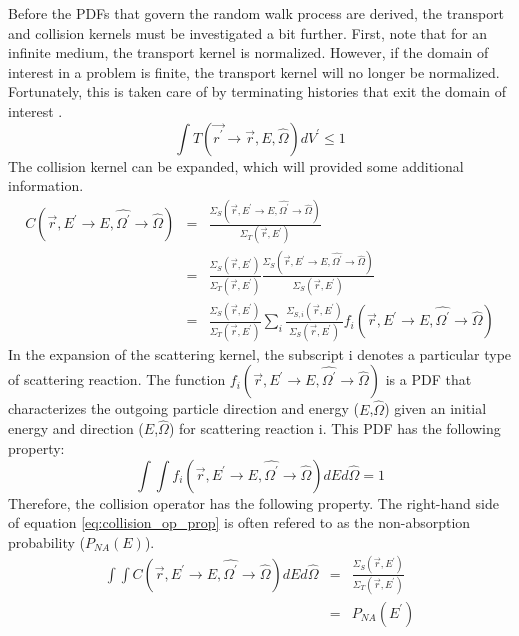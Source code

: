 Before the PDFs that govern the random walk process are derived, the transport
and collision kernels must be investigated a bit further. First, note that
for an infinite medium, the transport kernel is normalized. However, if the
domain of interest in a problem is finite, the transport kernel will no longer
be normalized. Fortunately, this is taken care of by terminating histories 
that exit the domain of interest \citep{irving_adjoint_1971}.
\begin{equation}
  \int T(\vec{r^{'}} \to \vec{r},E,\hat{\Omega})dV^{'} \leq 1
\end{equation}
The collision kernel can be expanded, which will provided some additional 
information. 
\begin{eqnarray}
  C(\vec{r},E^{'} \to E,\hat{\Omega^{'}} \to \hat{\Omega}) & = & 
  \frac{\Sigma_S(\vec{r},E^{'} \to E,\hat{\Omega^{'}} \to \hat{\Omega})}
       {\Sigma_T(\vec{r},E^{'})} \nonumber \\
  & = & \frac{\Sigma_S(\vec{r},E^{'})}{\Sigma_T(\vec{r},E^{'})}
       \frac{\Sigma_S(\vec{r},E^{'} \to E,\hat{\Omega^{'}} \to \hat{\Omega})}
            {\Sigma_S(\vec{r},E^{'})} \nonumber \\
  & = & \frac{\Sigma_S(\vec{r},E^{'})}{\Sigma_T(\vec{r},E^{'})} \sum_i
        \frac{\Sigma_{S,i}(\vec{r},E^{'})}{\Sigma_S(\vec{r},E^{'})}
        f_i(\vec{r},E^{'} \to E,\hat{\Omega^{'}} \to \hat{\Omega}) \nonumber
\end{eqnarray}
In the expansion of the scattering kernel, the subscript i denotes a particular
type of scattering reaction. The function 
$f_i(\vec{r},E^{'} \to E,\hat{\Omega^{'}} \to \hat{\Omega})$ is a PDF that 
characterizes the outgoing particle direction and energy ($E$,$\hat{\Omega}$) 
given an initial energy and direction ($E$,$\hat{\Omega}$) for scattering 
reaction i. This PDF has the following property:
\begin{equation}
  \int\int f_i(\vec{r},E^{'} \to E,\hat{\Omega^{'}} \to \hat{\Omega}) 
  dEd\hat{\Omega} = 1
\end{equation}
Therefore, the collision operator has the following property. The right-hand 
side of equation \ref{eq:collision_op_prop} is often refered to as the 
non-absorption probability ($P_{NA}(E)$).
\begin{eqnarray}
  \int\int C(\vec{r},E^{'} \to E,\hat{\Omega^{'}} \to \hat{\Omega}) 
  dEd\hat{\Omega} & = & \frac{\Sigma_S(\vec{r},E^{'})}{\Sigma_T(\vec{r},E^{'})}
  \label{eq:collision_op_prop} \\
  & = & P_{NA}(E^{'}) \nonumber 
\end{eqnarray}
